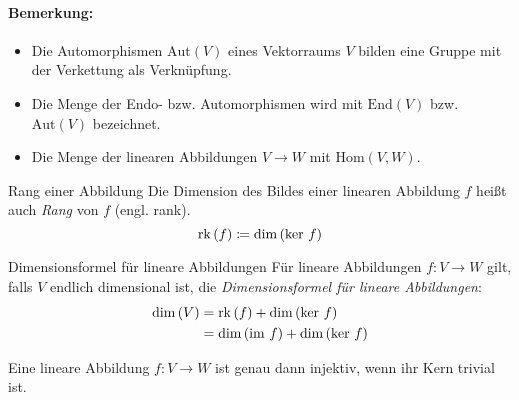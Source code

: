 \paragraph{Bemerkung:}
\begin{itemize}
	\item Die Automorphismen $\mathrm{Aut}(V)$ eines Vektorraums $V$ bilden eine Gruppe mit der Verkettung als Verknüpfung.
	\item Die Menge der Endo- bzw. Automorphismen wird mit $\mathrm{End}(V)$ bzw. $\mathrm{Aut}(V)$ bezeichnet.
	\item Die Menge der linearen Abbildungen $V\rightarrow W$ mit $\mathrm{Hom}(V,W)$.
\end{itemize}


\begin{definition}{Rang einer Abbildung}
  Die Dimension des Bildes einer linearen Abbildung $f$ heißt auch \emph{Rang} von $f$ (engl. rank).
  \begin{equation*}
    \operatorname{rk}\left(f\right) \coloneqq \operatorname{dim}\left(\operatorname{ker}\,f\right)
  \end{equation*}
\end{definition}

\begin{satz}{Dimensionsformel für lineare Abbildungen}
  Für lineare Abbildungen $f:V\rightarrow W$ gilt, falls $V$ endlich dimensional ist, die \emph{Dimensionsformel für lineare Abbildungen}:
  \begin{align*}
    \operatorname{dim}\left(V\right)&=\operatorname{rk}\left(f\right)+\operatorname{dim}\left(\operatorname{ker}\,f\right)\\
    &=\operatorname{dim}\left(\operatorname{im}\,f\right)+\operatorname{dim}\left(\operatorname{ker}\,f\right)
  \end{align*}
\end{satz}

\begin{lemma}{}
  Eine lineare Abbildung $f:V\rightarrow W$ ist genau dann injektiv, wenn ihr Kern trivial ist.
\end{lemma}
